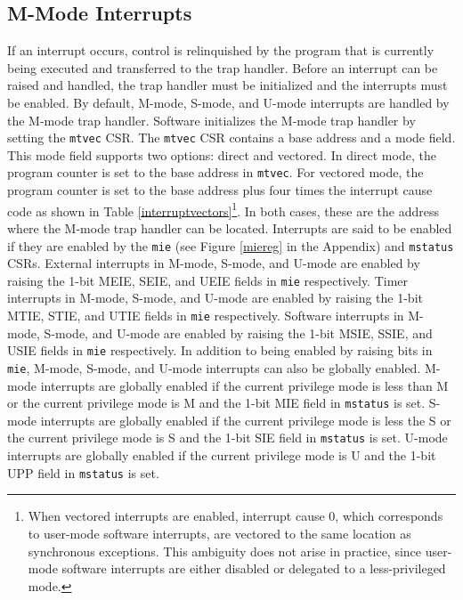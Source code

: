 \documentclass[12pt]{article}
\begin{document}
\subsection{M-Mode Interrupts}
If an interrupt occurs, control is relinquished by the program that is currently being executed and transferred to the trap handler. Before an interrupt can be raised and handled, the trap handler must be initialized and the interrupts must be enabled. By default, M-mode, S-mode, and U-mode interrupts are handled by the M-mode trap handler. Software initializes the M-mode trap handler by setting the {\tt{mtvec}} CSR. The {\tt{mtvec}} CSR contains a base address and a mode field. This mode field supports two options: direct and vectored. In direct mode, the program counter is set to the base address in {\tt{mtvec}}. For vectored mode, the program counter is set to the base address plus four times the interrupt cause code as shown in Table \ref{interruptvectors}\footnote[4]{When vectored interrupts are enabled, interrupt cause 0, which corresponds to user-mode software interrupts, are vectored to the same location as synchronous exceptions. This ambiguity does not arise in practice, since user-mode software interrupts are either disabled or delegated to a less-privileged mode.}. In both cases, these are the address where the M-mode trap handler can be located. Interrupts are said to be enabled if they are enabled by the {\tt{mie}} (see Figure \ref{miereg} in the Appendix) and {\tt{mstatus}} CSRs. External interrupts in M-mode, S-mode, and U-mode are enabled by raising the 1-bit MEIE, SEIE, and UEIE fields in {\tt{mie}} respectively. Timer interrupts in M-mode, S-mode, and U-mode are enabled by raising the 1-bit MTIE, STIE, and UTIE fields in {\tt{mie}} respectively. Software interrupts in M-mode, S-mode, and U-mode are enabled by raising the 1-bit MSIE, SSIE, and USIE fields in {\tt{mie}} respectively. In addition to being enabled by raising bits in {\tt{mie}}, M-mode, S-mode, and U-mode interrupts can also be globally enabled. M-mode interrupts are globally enabled if the current privilege mode is less than M or the current privilege mode is M and the 1-bit MIE field in {\tt{mstatus}} is set. S-mode interrupts are globally enabled if the current privilege mode is less the S or the current privilege mode is S and the 1-bit SIE field in {\tt{mstatus}} is set. U-mode interrupts are globally enabled if the current privilege mode is U and the 1-bit UPP field in {\tt{mstatus}} is set.
\end{document}
